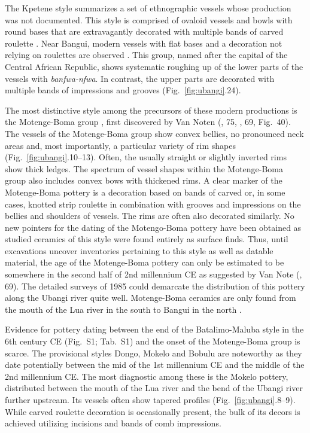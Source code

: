 \documentclass[smallextended,natbib]{svjour3}       %
\begin{document}
The Kpetene style summarizes a set of ethnographic vessels whose production was not documented. This style is comprised of ovaloid vessels and bowls with round bases that are extravagantly decorated with multiple bands of carved roulette \citep[103--105]{Seidensticker.2021e}. Near Bangui, modern vessels with flat bases and a decoration not relying on roulettes are observed \citep[112--114]{Seidensticker.2021e}. This group, named after the capital of the Central African Republic, shows systematic roughing up of the lower parts of the vessels with \textit{banfwa-nfwa}. In contrast, the upper parts are decorated with multiple bands of impressions and grooves (Fig.~\ref{fig:ubangi}.24).

The most distinctive style among the precursors of these modern productions is the Motenge-Boma group \citep[99--103]{Seidensticker.2021e}, first discovered by Van Noten (\citeyear{vanNoten.1978}, 75, \citeyear{vanNoten.1982a}, 69, Fig.~40). The vessels of the Motenge-Boma group show convex bellies, no pronounced neck areas and, most importantly, a particular variety of rim shapes (Fig.~\ref{fig:ubangi}.10--13). Often, the usually straight or slightly inverted rims show thick ledges. The spectrum of vessel shapes within the Motenge-Boma group also includes convex bows with thickened rims. A clear marker of the Motenge-Boma pottery is a decoration based on bands of carved or, in some cases, knotted strip roulette in combination with grooves and impressions on the bellies and shoulders of vessels. The rims are often also decorated similarly. No new pointers for the dating of the Motengo-Boma pottery have been obtained as studied ceramics of this style were found entirely as surface finds. Thus, until excavations uncover inventories pertaining to this style as well as datable material, the age of the Motenge-Boma pottery can only be estimated to be somewhere in the second half of 2nd millennium CE as suggested by Van Note (\citeyear{vanNoten.1982a}, 69). The detailed surveys of 1985 could demarcate the distribution of this pottery along the Ubangi river quite well. Motenge-Boma ceramics are only found from the mouth of the Lua river in the south to Bangui in the north \citep[Fig.~\ref{fig:timeslices_2_lia}D--E;][102 Fig.~37]{Seidensticker.2021e}.

Evidence for pottery dating between the end of the Batalimo-Maluba style in the 6th century CE (Fig.~S1; Tab.~S1) and the onset of the Motenge-Boma group is scarce. The provisional styles Dongo, Mokelo and Bobulu \citep[Fig.~\ref{fig:chrono};][86--95]{Seidensticker.2021e} are noteworthy as they date potentially between the mid of the 1st millennium CE and the middle of the 2nd millennium CE. The most diagnostic among these is the Mokelo pottery, distributed between the mouth of the Lua river and the bend of the Ubangi river further upstream. Its vessels often show tapered profiles (Fig.~\ref{fig:ubangi}.8--9). While carved roulette decoration is occasionally present, the bulk of its decors is achieved utilizing incisions and bands of comb impressions.
\end{document}
